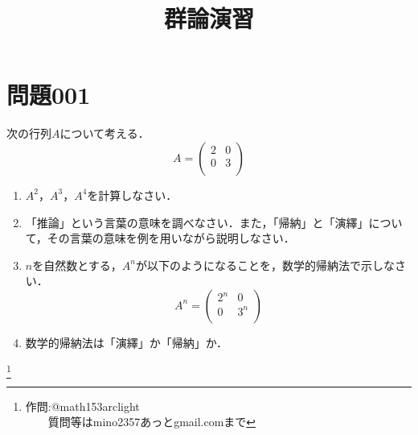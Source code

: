 \documentclass[12pt]{jarticle}
\title{群論演習}
\date{}
\begin{document}
\maketitle

\section*{問題001}
次の行列$A$について考える．
\[
  A = \left(
    \begin{array}{ccc}
      2 & 0 \\
      0 & 3 \\
    \end{array}
  \right)
\]


\begin{enumerate}
\renewcommand{\labelenumi}{(\arabic{enumi})}
\item $A^2$，$A^3$，$A^4$を計算しなさい．
\item 「推論」という言葉の意味を調べなさい．また，「帰納」と「演繹」について，その言葉の意味を例を用いながら説明しなさい．
\item $n$を自然数とする，$A^{n}$が以下のようになることを，数学的帰納法で示しなさい．
\[
  A^{n} = \left(
    \begin{array}{ccc}
      2^n & 0 \\
      0 & 3^n \\
    \end{array}
  \right)
\]
\item 数学的帰納法は「演繹」か「帰納」か．
\end{enumerate}


\footnote[0]{
作問:@math153arclight\\
　　質問等はmino2357あっとgmail.comまで
}

\thispagestyle{empty}
\end{document}
